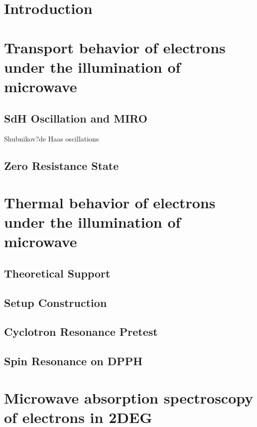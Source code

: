 \documentclass[12pt]{ruthesis}
\begin{document}
\chapter{Introduction}\label{Intro}


\chapter{Transport behavior of electrons under the illumination of microwave}\label{Transport}

\section{SdH Oscillation and MIRO}\label{SdHO}
Shubnikov?de Haas oscillations

\section{Zero Resistance State}\label{ZRS}

\chapter{Thermal behavior of electrons under the illumination of microwave}\label{Thermal}

\section{Theoretical Support}\label{Theoretical}

\section{Setup Construction}\label{Construction}

\section{Cyclotron Resonance Pretest}\label{Cyclotron}

\section{Spin Resonance on DPPH}\label{DPPH}

\chapter{Microwave absorption spectroscopy of electrons in 2DEG}\label{Absorption}
\end{document}
